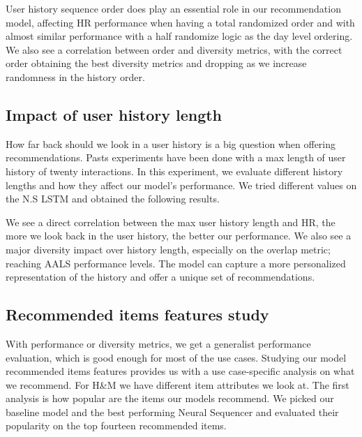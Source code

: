 \documentclass{kththesis}
\begin{document}
\begin{center}

\end{center}

User history sequence order does play an essential role in our recommendation model, affecting HR performance when having a total randomized order and with almost similar performance with a half randomize logic as the day level ordering. We also see a correlation between order and diversity metrics, with the correct order obtaining the best diversity metrics and dropping as we increase randomness in the history order.


\subsection{Impact of user history length}
How far back should we look in a user history is a big question when offering recommendations. Pasts experiments have been done with a max length of user history of twenty interactions. In this experiment, we evaluate different history lengths and how they affect our model's performance. We tried different values on the N.S LSTM and obtained the following results.

\begin{center}

\end{center}


We see a direct correlation between the max user history length and HR, the more we look back in the user history, the better our performance. We also see a major diversity impact over history length, especially on the overlap metric; reaching AALS performance levels. The model can capture a more personalized representation of the history and offer a unique set of recommendations.

\subsection{Recommended items features study}
With performance or diversity metrics, we get a generalist performance evaluation, which is good enough for most of the use cases. Studying our model recommended items features provides us with a use case-specific analysis on what we recommend. For H\&M we have different item attributes we look at. The first analysis is how popular are the items our models recommend. We picked our baseline model and the best performing Neural Sequencer and evaluated their popularity on the top fourteen recommended items.
\end{document}
